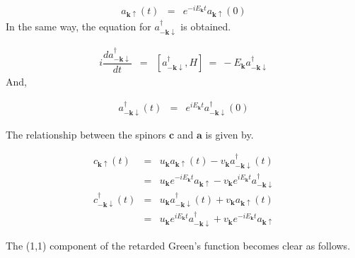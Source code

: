 \documentclass[uplatex,a4j,12pt,dvipdfmx]{jsarticle}
\begin{document}
\begin{eqnarray}
	a_{\bm{k} \uparrow}(t)
	&=&
	e^{ - i E_{\bm{k}} t }
	a_{\bm{k} \uparrow}(0)
\end{eqnarray}
%
In the same way, the equation for $a_{-\bm{k} \downarrow}^{\dagger}$ is obtained.

\begin{eqnarray}
	i \dfrac{d a_{-\bm{k} \downarrow}^{\dagger} }{dt}
	&=&
	\left[ a_{-\bm{k} \downarrow}^{\dagger} , H \right]
	\ = \
	-
	E_{\bm{k}}
	a_{-\bm{k} \downarrow}^{\dagger}
\end{eqnarray}
%
And,

\begin{eqnarray}
	a_{-\bm{k} \downarrow}^{\dagger}(t)
	&=&
	e^{ i E_{\bm{k}} t }
	a_{-\bm{k} \downarrow}^{\dagger}(0)
\end{eqnarray}
%

The relationship between the spinors $\bm{c}$ and $\bm{a}$ is given by.

\begin{eqnarray}
	c_{\bm{k} \uparrow}(t)
	&=&
	u_{\bm{k}} a_{\bm{k} \uparrow}(t)
	-
	v_{\bm{k}} a_{- \bm{k} \downarrow}^{\dagger}(t)
	\nonumber \\[2mm]
	&=&
	u_{\bm{k}} e^{ - i E_{\bm{k}} t }
	a_{\bm{k} \uparrow}
	-
	v_{\bm{k}} e^{ i E_{\bm{k}} t }
	a_{-\bm{k} \downarrow}^{\dagger}
	\\[5mm]
	c_{- \bm{k} \downarrow}^{\dagger}(t)
	&=&
	u_{\bm{k}} a_{- \bm{k} \downarrow}^{\dagger}(t)
	+
	v_{\bm{k}} a_{\bm{k} \uparrow}(t)
	\nonumber \\[2mm]
	&=&
	u_{\bm{k}} e^{ i E_{\bm{k}} t }
	a_{-\bm{k} \downarrow}^{\dagger}
	+
	v_{\bm{k}} e^{ - i E_{\bm{k}} t }
	a_{\bm{k} \uparrow}
\end{eqnarray}
%

The (1,1) component of the retarded Green's function becomes clear as follows.
\end{document}
